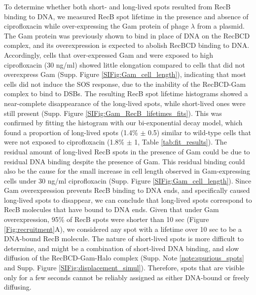 To determine whether both short- and long-lived spots resulted from RecB binding to DNA, we measured RecB spot lifetime in the presence and absence of ciprofloxacin while over-expressing the Gam protein of phage $\lambda$ from a plasmid. The Gam protein was previously shown to bind in place of DNA on the RecBCD complex\cite{Wilkinson2016}, and its overexpression is expected to abolish RecBCD binding to DNA. Accordingly, cells that over-expressed Gam and were exposed to high ciprofloxacin (30 ng/ml) showed little elongation compared to cells that did not overexpress Gam (Supp. Figure \ref{SIFig:Gam_cell_length}), indicating that most cells did not induce the SOS response, due to the inability of the RecBCD-Gam complex to bind to DSBs. The resulting RecB spot lifetime histograms showed a near-complete disappearance of the long-lived spots, while short-lived ones were still present (Supp. Figure \ref{SIFig:Gam_RecB_lifetimes_fits}). This was confirmed by fitting the histogram with our bi-exponential decay model, which found a proportion of long-lived spots (1.4\% $\pm$ 0.5) similar to wild-type cells that were not exposed to ciprofloxacin (1.8\% $\pm$ 1, Table \ref{tab:fit_results}). The residual amount of long-lived RecB spots in the presence of Gam could be due to residual DNA binding despite the presence of Gam. This residual binding could also be the cause for the small increase in cell length observed in Gam-expressing cells under 30 ng/ml ciprofloxacin (Supp. Figure \ref{SIFig:Gam_cell_length}). Since Gam overexpression prevents RecB binding to DNA ends, and specifically caused long-lived spots to disappear, we can conclude that long-lived spots correspond to RecB molecules that have bound to DNA ends. Given that under Gam overexpression, 95\% of RecB spots were shorter than 10 sec (Figure \ref{Fig:recruitment}A), we considered any spot with a lifetime over 10 sec to be a DNA-bound RecB molecule. The nature of short-lived spots is more difficult to determine, and might be a combination of short-lived DNA binding, and slow diffusion of the RecBCD-Gam-Halo complex (Supp. Note \ref{note:spurious_spots} and Supp. Figure \ref{SIFig:displacement_simul}). Therefore, spots that are visible only for a few seconds cannot be reliably assigned as either DNA-bound or freely diffusing.

